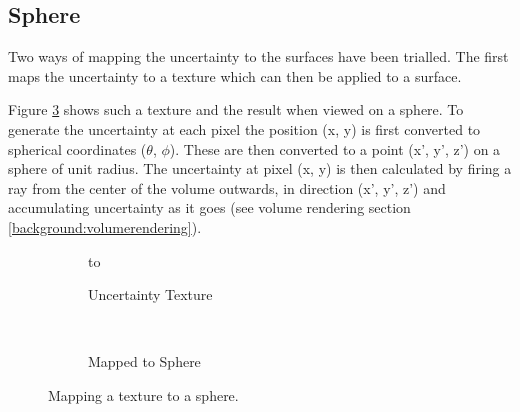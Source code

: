 \subsection*{Sphere}
Two ways of mapping the uncertainty to the surfaces have been trialled. The first maps the uncertainty to a texture which can then be applied to a surface. 

Figure \ref{fig:uncertaintytexture} shows such a texture and the result when viewed on a sphere. To generate the uncertainty at each pixel the position (x, y) is first converted to spherical coordinates ($\theta$, $\phi$). These are then converted to a point (x', y', z') on a sphere of unit radius. The uncertainty at pixel (x, y) is then calculated by firing a ray from the center of the volume outwards, in direction (x', y', z') and accumulating uncertainty as it goes (see volume rendering section \ref{background:volumerendering}).

\begin{figure}[H]
  \centering
  \begin{subfigure}[b]{0.5\textwidth}
    \vbox to \ht{}
    \caption{Uncertainty Texture}
    \label{fig:texturetexture}
  \end{subfigure}%
  ~ %
  \begin{subfigure}[b]{0.5\textwidth}
    \usebox{\mybox}
    \caption{Mapped to Sphere}
    \label{fig:texturesphere}
  \end{subfigure}
  \caption{Mapping a texture to a sphere.}\label{fig:uncertaintytexture}
\end{figure}


